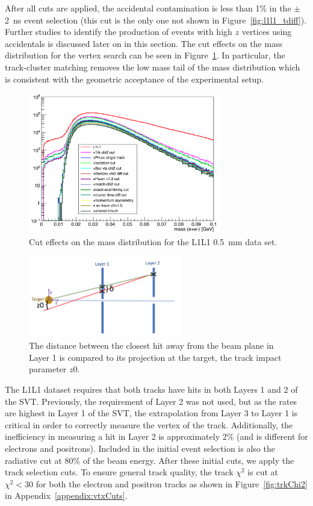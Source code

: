 After all cuts are applied, the accidental contamination is less than 1$\%$ in the $\pm$ 2~ns event selection (this cut is the only one not shown in Figure~\ref{fig:l1l1_tdiff}). Further studies to identify the production of events with high $z$ vertices using accidentals is discussed later on in this section. The cut effects on the mass distribution for the vertex search can be seen in Figure~\ref{fig:l1l1_mass}. In particular, the track-cluster matching removes the low mass tail of the mass distribution which is consistent with the geometric acceptance of the experimental setup.
\begin{figure}[htb]
  \centering
      \includegraphics[width=0.75\textwidth]{pics/searching/mass_L1L1_cuts.png}
  \caption[Cut effects on the mass distribution]{Cut effects on the mass distribution for the L1L1 0.5~mm data set.}
  \label{fig:l1l1_mass}
\end{figure} 
\begin{figure}[htb]
  \centering
      \includegraphics[width=0.6\textwidth]{pics/searching/isolationPic.png}
  \caption[Track isolation cut]{The distance between the closest hit away from the beam plane in Layer 1 is compared to its projection at the target, the track impact parameter $z0$.}
  \label{fig:isoPic}
\end{figure}
The L1L1 dataset requires that both tracks have hits in both Layers 1 and 2 of the SVT. Previously, the requirement of Layer 2 was not used, but as the rates are highest in Layer 1 of the SVT, the extrapolation from Layer 3 to Layer 1 is critical in order to correctly measure the vertex of the track. Additionally, the inefficiency in measuring a hit in Layer 2 is approximately 2$\%$ (and is different for electrons and positrons). Included in the initial event selection is also the radiative cut at 80$\%$ of the beam energy. After these initial cuts, we apply the track selection cuts. To ensure general track quality, the track $\chi^2$ is cut at $\chi^2<30$ for both the electron and positron tracks as shown in Figure~\ref{fig:trkChi2} in Appendix~\ref{appendix:vtxCuts}.\\
